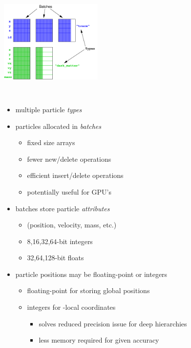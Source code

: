
\begin{frame}[fragile,label=ss-particles] 
\begin{minipage}{1.8in}
\includegraphics[width=2.0in]{particles-design.pdf} \ \\
\end{minipage} \ 
\begin{minipage}{2.5in}
\begin{itemize}
\item multiple particle \textit{types}
\item particles allocated in \textit{batches}
\begin{itemize}
\item fixed size arrays
\item fewer new/delete operations
\item efficient insert/delete operations
\item potentially useful for GPU's
\end{itemize}
\item batches store particle \textit{attributes}
\begin{itemize}
\item (position, velocity, mass, etc.)
\item 8,16,32,64-bit integers
\item 32,64,128-bit floats
\end{itemize}
\end{itemize}
\end{minipage}
\begin{itemize}
\item particle positions may be floating-point or integers
\begin{itemize}
\item floating-point for storing global positions
\item integers for -local coordinates
\begin{itemize}
\item solves reduced precision issue for deep hierarchies
\item less memory required for given accuracy
\end{itemize}
\end{itemize}
\end{itemize}


\end{frame}

